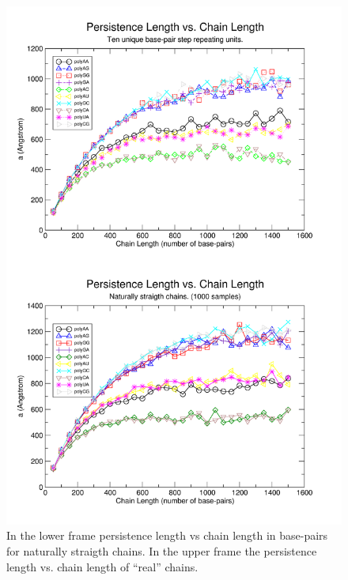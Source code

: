 \begin{figure}
\centering
\includegraphics[angle=0, scale=3.2]{Chapter4/perVlen.png}
\caption{In the lower frame persistence length vs chain length in
  base-pairs for naturally straigth chains. In the upper frame the
  persistence length vs. chain length of ``real'' chains.}
\label{fig:perVlen}
\end{figure}

